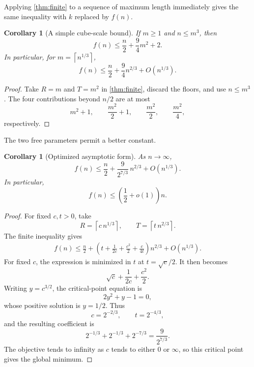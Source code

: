 \documentclass[11pt]{article}
\numberwithin{equation}{section}
\newtheorem{corollary}[theorem]{Corollary}
\theoremstyle{remark}
\newcommand{\ceil}[1]{\left\lceil #1\right\rceil}
\begin{document}
Applying \cref{thm:finite} to a sequence of maximum length immediately
gives the same inequality with \(k\) replaced by \(f(n)\).

\begin{corollary}[A simple cube-scale bound]
\label{cor:cube}
If \(m\geq1\) and \(n\leq m^3\), then
\begin{equation}
  f(n)\leq \frac n2+\frac94m^2+2.
  \label{eq:simple-cube}
\end{equation}
In particular, for \(m=\ceil{n^{1/3}}\),
\[
  f(n)\leq\frac n2+\frac94n^{2/3}+O(n^{1/3}).
\]
\end{corollary}

\begin{proof}
Take \(R=m\) and \(T=m^2\) in \cref{thm:finite}, discard the
floors, and use \(n\leq m^3\).  The four contributions beyond \(n/2\)
are at most
\[
  m^2+1,\qquad
  \frac{m^2}{2}+1,\qquad
  \frac{m^2}{2},\qquad
  \frac{m^2}{4},
\]
respectively.
\end{proof}

The two free parameters permit a better constant.

\begin{corollary}[Optimized asymptotic form]
\label{cor:optimized}
As \(n\to\infty\),
\begin{equation}
  f(n)\leq\frac n2+
  \frac{9}{2^{7/3}}\,n^{2/3}
  +O(n^{1/3}).
  \label{eq:optimized}
\end{equation}
In particular,
\[
  f(n)\leq\left(\frac12+o(1)\right)n.
\]
\end{corollary}

\begin{proof}
For fixed \(c,t>0\), take
\[
  R=\ceil{c\,n^{1/3}},
  \qquad
  T=\ceil{t\,n^{2/3}}.
\]
The finite inequality gives
\begin{align*}
  f(n)
  \leq \frac n2+
  \left(
    t+\frac1{2c}+\frac{c^2}{2}+\frac{c}{4t}
  \right)n^{2/3}
  +O(n^{1/3}).
\end{align*}
For fixed \(c\), the expression is minimized in \(t\) at
\(t=\sqrt{c}/2\).  It then becomes
\[
  \sqrt{c}+\frac1{2c}+\frac{c^2}{2}.
\]
Writing \(y=c^{3/2}\), the critical-point equation is
\[
  2y^2+y-1=0,
\]
whose positive solution is \(y=1/2\).  Thus
\[
  c=2^{-2/3},\qquad t=2^{-4/3},
\]
and the resulting coefficient is
\[
  2^{-1/3}+2^{-1/3}+2^{-7/3}
  =\frac{9}{2^{7/3}}.
\]
The objective tends to infinity as \(c\) tends to either \(0\) or
\(\infty\), so this critical point gives the global minimum.
\end{proof}
\end{document}
